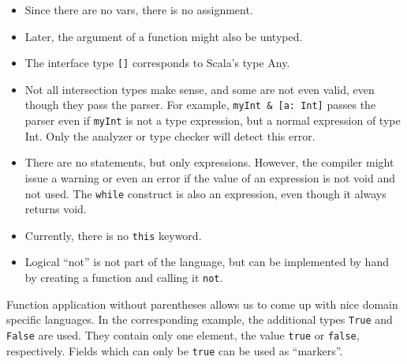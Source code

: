 \documentclass[12pt, draft]{article}
\begin{document}
\begin{itemize}
\item Since there are no vars, there is no assignment.
\item Later, the argument of a function might also be untyped.
\item The interface type \texttt{[]} corresponds to Scala's type Any.
\item Not all intersection types make sense, and some are not even valid, even though they pass the parser. For example, \texttt{myInt \& [a: Int]}
passes the parser even if \texttt{myInt} is not a type expression, but a normal expression of type Int. Only the analyzer or type checker will detect this error.
\item There are no statements, but only expressions. However, the compiler might issue a warning or even an error if the value of an expression is not void and not used. The \texttt{while} construct is also an expression, even though it always returns void.
\item Currently, there is no \texttt{this} keyword.
\item Logical ``not'' is not part of the language, but can be implemented by hand by creating a function and calling it \texttt{not}.
\end{itemize}

Function application without parentheses allows us to come up with nice domain specific languages. In the corresponding example, the additional types \texttt{True} and \texttt{False} are used. They contain only one element, the value \texttt{true} or \texttt{false}, respectively. Fields which can only be \texttt{true} can be used as ``markers''.

\end{document}
